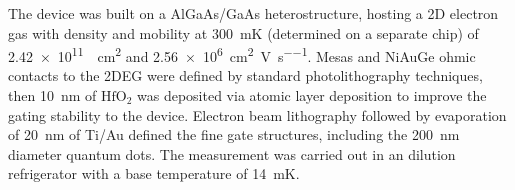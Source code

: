 \documentclass[twocolumn,showpacs,preprintnumbers,amsmath,amssymb,pra,aps,superscriptaddress]{revtex4-1}
\begin{document}
The device was built on a AlGaAs/GaAs heterostructure, hosting a 2D electron gas with density and mobility at \SI{300}{\milli\kelvin} (determined on a separate chip) of \SI{2.42e11}{\per\square\centi\metre} and \SI[per-mode=symbol]{2.56e6}{\square\centi\metre\per\volt\per\second}.   Mesas and NiAuGe ohmic contacts to the 2DEG were defined by standard photolithography techniques, then \SI{10}{\nano\metre} of $\mathrm{HfO_2}$ was deposited via atomic layer deposition to improve the gating stability to the device. Electron beam lithography followed by evaporation of \SI{20}{\nano\metre} of Ti/Au defined the fine gate structures, including the \SI{200}{\nano\metre} diameter quantum dots. The measurement was carried out in an dilution refrigerator with a base temperature of \SI{14}{\milli\kelvin}.

\end{document}
